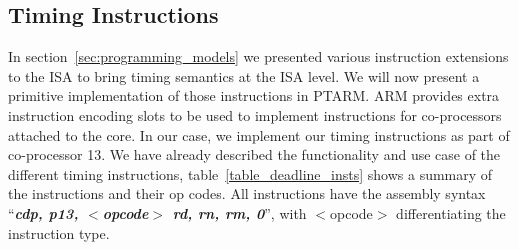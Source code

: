 \subsection{Timing Instructions}
In section~\ref{sec:programming_models} we presented various instruction extensions to the ISA to bring timing semantics at the ISA level.
We will now present a primitive implementation of those instructions in PTARM.  
ARM provides extra instruction encoding slots to be used to implement instructions for co-processors attached to the core. 
In our case, we implement our timing instructions as part of co-processor 13.
We have already described the functionality and use case of the different timing instructions, table~\ref{table_deadline_insts} shows a summary of the instructions and their op codes.
All instructions have the assembly syntax ``\textbf{\textit{cdp, p13, $<$opcode$>$ rd, rn, rm, 0}}'', with $<$opcode$>$ differentiating the instruction type.
   
\begin{table}
\noindent{}
\caption{List of assembly deadline instructions}
\label{table_deadline_insts}
\end{table}

